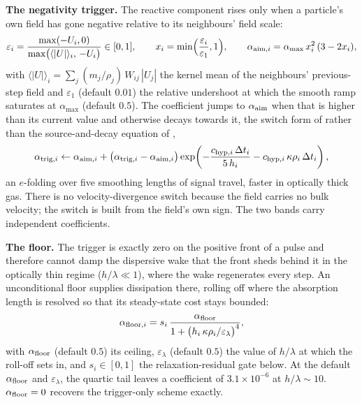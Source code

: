 \textbf{The negativity trigger.} The reactive component rises only
when a particle's own field has gone negative relative to its
neighbours' field scale:
\begin{equation}
  \varepsilon_i = \frac{\max(-U_i, 0)}{\max\!\big(\langle|U|\rangle_i,\,-U_i\big)}
  \in[0,1], \qquad
  x_i = \min\!\Big(\frac{\varepsilon_i}{\varepsilon_1}, 1\Big), \qquad
  \alpha_{{\rm aim},i} = \alpha_{\max}\,x_i^2\,(3-2x_i) ,
  \label{eq:fuv-diss-trigger}
\end{equation}
with $\langle|U|\rangle_i = \sum_j (m_j/\rho_j)\,W_{ij}\,|U_j|$ the
kernel mean of the neighbours' previous-step field and $\varepsilon_1$
(default $0.01$) the relative undershoot at which the smooth ramp
saturates at $\alpha_{\max}$ (default $0.5$). The coefficient jumps to
$\alpha_{\rm aim}$ when that is higher than its current value and
otherwise decays towards it, the switch form of \citet{CullenDehnen2010}
rather than the source-and-decay equation of \citet{MorrisMonaghan1997},
\begin{equation}
  \alpha_{{\rm trig},i} \leftarrow \alpha_{{\rm aim},i}
    + \big(\alpha_{{\rm trig},i} - \alpha_{{\rm aim},i}\big)
      \exp\!\left(-\frac{c_{{\rm hyp},i}\,\Delta t_i}{5\,h_i}
                  - c_{{\rm hyp},i}\,\kappa\rho_i\,\Delta t_i\right) ,
  \label{eq:fuv-diss-decay}
\end{equation}
an $e$-folding over five smoothing lengths of signal travel, faster in
optically thick gas. There is no velocity-divergence switch because the
field carries no bulk velocity; the switch is built from the field's own
sign. The two bands carry independent coefficients.

\textbf{The floor.} The trigger is exactly zero on the positive front
of a pulse and therefore cannot damp the dispersive wake that the front
sheds behind it in the optically thin regime ($h/\lambda\ll1$), where
the wake regenerates every step. An unconditional floor supplies
dissipation there, rolling off where the absorption length is resolved
so that its steady-state cost stays bounded:
\begin{equation}
  \alpha_{{\rm floor},i} = s_i\,
    \frac{\alpha_{\rm floor}}{1 + \big(h_i\,\kappa\rho_i/\varepsilon_\lambda\big)^4} ,
  \label{eq:fuv-diss-floor}
\end{equation}
with $\alpha_{\rm floor}$ (default $0.5$) its ceiling,
$\varepsilon_\lambda$ (default $0.5$) the value of $h/\lambda$ at which
the roll-off sets in, and $s_i\in[0,1]$ the relaxation-residual gate
below. At the default $\alpha_{\rm floor}$ and $\varepsilon_\lambda$,
the quartic tail leaves a coefficient of $3.1\times10^{-6}$ at
$h/\lambda\sim10$. $\alpha_{\rm floor} = 0$ recovers the trigger-only
scheme exactly.


